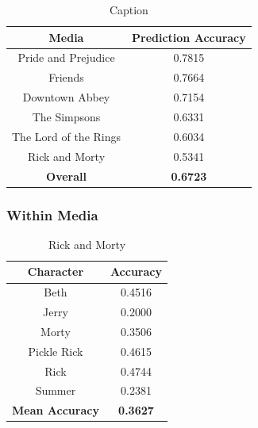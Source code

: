 \documentclass{article}
\begin{document}
\begin{titlepage}
\begin{table}[H]
    \centering
    \begin{tabular}{|c|c|}
        \hline
        \textbf{Media} & \textbf{Prediction Accuracy} \\
        \hline
         Pride and Prejudice & 0.7815 \\ 
         \hline
         Friends & 0.7664 \\
         \hline
         Downtown Abbey & 0.7154 \\ 
         \hline
         The Simpsons & 0.6331 \\ 
         \hline
         The Lord of the Rings & 0.6034 \\ 
         \hline
         Rick and Morty & 0.5341 \\ 
         \hline
         \textbf{Overall} & \textbf{0.6723} \\
        \hline
    \end{tabular}
    \caption{Caption}
    \label{tab:my_label}
\end{table}


\subsubsection{Within Media}


\begin{table}[H]
    \centering
    \begin{tabular}{|c|c|}
        \hline
        \textbf{Character} & \textbf{Accuracy} \\
        \hline
        Beth & 0.4516 \\
        \hline
        Jerry & 0.2000 \\
        \hline
        Morty & 0.3506 \\
        \hline
        Pickle Rick & 0.4615 \\
        \hline
        Rick & 0.4744 \\
        \hline
        Summer & 0.2381 \\
        \hline
        \textbf{Mean Accuracy} & \textbf{0.3627} \\
        \hline
    \end{tabular}
    \caption{Rick and Morty}
    \label{tab:rick_and_morty_accuracy}
\end{table}


\end{titlepage}
\end{document}
